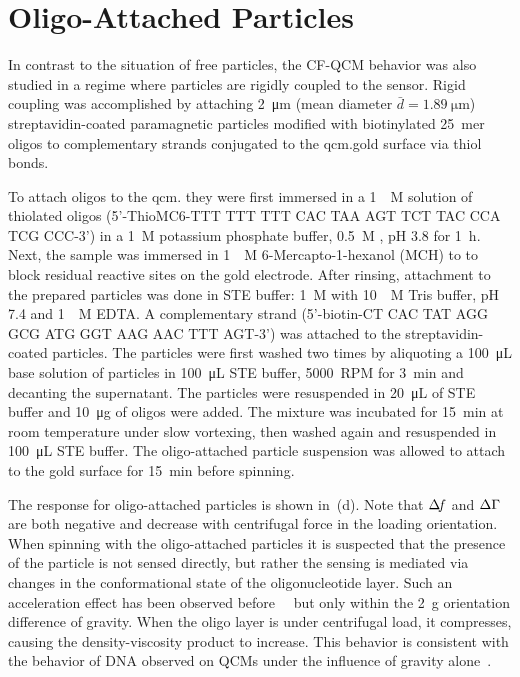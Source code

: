 \section{Oligo-Attached Particles}
In contrast to the situation of free particles, the CF-QCM behavior was
also studied in a regime where particles are rigidly coupled to the sensor.
Rigid coupling was accomplished by attaching \SI{2}{\micro\meter} (mean
diameter $\bar{d}=\SI{1.89}{\micro\meter}$) streptavidin-coated
paramagnetic particles modified with biotinylated \SI{25}{mer} oligos to
complementary strands conjugated to the \gls{qcm}.gold surface via thiol bonds.

To attach oligos to the \gls{qcm}. they were first immersed in a
\SI{1}{\micro\textsc{M}} solution of thiolated oligos (5'-ThioMC6-TTT TTT
TTT CAC TAA AGT TCT TAC CCA TCG CCC-3') in a \SI{1}{\textsc{M}} potassium
phosphate buffer, \SI{0.5}{\textsc{M}} , pH 3.8 for
\SI{1}{\hour}.  Next, the sample was immersed in \SI{1}{\milli\textsc{M}}
6-Mercapto-1-hexanol (MCH) to to block residual reactive sites on the
gold electrode.  After rinsing, attachment to the prepared particles was
done in STE buffer: \SI{1}{\textsc{M}}  with
\SI{10}{\milli\textsc{M}} Tris buffer, pH 7.4 and \SI{1}{\milli\textsc{M}}
EDTA\@.  A complementary strand (5'-biotin-CT CAC TAT AGG GCG ATG GGT AAG
AAC TTT AGT-3') was attached to the streptavidin-coated particles.  The
particles were first washed two times by aliquoting a
\SI{100}{\micro\liter} base solution of particles in \SI{100}{\micro\liter}
STE buffer, \SI{5000}{RPM} for \SI{3}{\minute} and decanting the
supernatant.  The particles were resuspended in \SI{20}{\micro\liter} of
STE buffer and \SI{10}{\micro\gram} of oligos were added.  The mixture was
incubated for \SI{15}{\minute} at room temperature under slow vortexing,
then washed again and resuspended in \SI{100}{\micro\liter} STE buffer.
The oligo-attached particle suspension was allowed to attach to the gold
surface for \SI{15}{\minute} before spinning.

The response for oligo-attached particles is shown in
\,(d).  Note that $\Delta\!f$ and $\Delta\Gamma$ are both negative and
decrease with centrifugal force in the loading orientation.  When spinning
with the oligo-attached particles it is suspected that the presence of the
particle is not sensed directly, but rather the sensing is mediated via
changes in the conformational state of the oligonucleotide layer.  Such an
acceleration effect has been observed
before~\cite{yoshimoto2002effect}~\cite{fawcett2004evidence} but only within
the \SI{2}{g} orientation difference of gravity.  When the oligo layer is
under centrifugal load, it compresses, causing the density-viscosity product
to increase.  This behavior is consistent with the behavior of DNA observed on
QCMs under the influence of gravity alone~\cite{fawcett2004evidence}.

